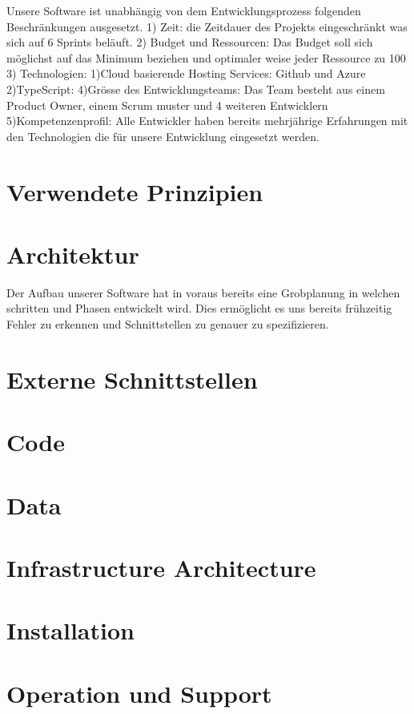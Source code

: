 \documentclass[a4paper, 11pt]{scrartcl}
\let\oldsection\section
\renewcommand\section{\clearpage\oldsection}
\begin{document}
Unsere Software ist unabhängig von dem Entwicklungsprozess folgenden Beschränkungen ausgesetzt.
1) Zeit: die Zeitdauer des Projekts eingeschränkt was sich auf 6 Sprints beläuft.
2) Budget und Ressourcen: Das Budget soll sich möglichst auf das Minimum beziehen und optimaler weise jeder Ressource zu 100%
3) Technologien:
1)Cloud basierende Hosting Services: Github und Azure
2)TypeScript:
4)Grösse des Entwicklungsteams: Das Team besteht aus einem Product Owner, einem Scrum muster und 4 weiteren Entwicklern
5)Kompetenzenprofil: Alle Entwickler haben bereits mehrjährige Erfahrungen mit den Technologien die für unsere Entwicklung eingesetzt werden.

\section{Verwendete Prinzipien}

\section{Architektur}

Der Aufbau unserer Software hat in voraus bereits eine Grobplanung in welchen schritten und Phasen entwickelt wird.
Dies ermöglicht es uns bereits frühzeitig Fehler zu erkennen und Schnittstellen zu genauer zu spezifizieren.

\section{Externe Schnittstellen}

\section{Code}

\section{Data}

\section{Infrastructure Architecture}

\section{Installation}

\section{Operation und Support}
\end{document}
